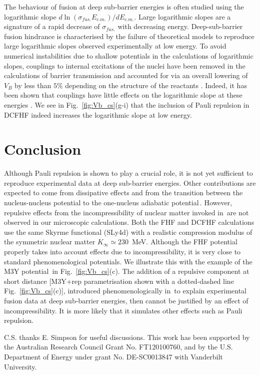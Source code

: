 The behaviour of fusion at deep sub-barrier energies is often studied using the  logarithmic slope 
$d\ln(\sigma_{fus.}E_{c.m.})/dE_{c.m.}$. 
Large logarithmic slopes are a signature of a rapid decrease of $\sigma_{fus.}$ with decreasing energy. 
Deep-sub-barrier fusion hindrance is characterised by the failure of theoretical models 
to reproduce  large logarithmic slopes observed experimentally at low energy. 
To avoid numerical instabilities due to shallow potentials in the calculations 
of logarithmic slopes, couplings to internal excitations of the nuclei have been removed 
in the calculations of barrier transmission and accounted for via an overall lowering of $V_B$ 
by less than $5\%$ depending on the structure of the reactants \citep{dasgupta2007}. 
Indeed, it has been shown that couplings have little effects on the logarithmic slope 
at these energies \citep{dasgupta2007}. 
We see in Fig.~\ref{fig:Vb_cs}(g-i) that the inclusion of Pauli repulsion in DCFHF 
indeed increases the logarithmic slope at low energy. 

\section{Conclusion}

Although Pauli repulsion is shown to play a crucial role, it is not yet sufficient to reproduce  
experimental data at deep sub-barrier energies. 
Other contributions are expected to come from dissipative effects \citep{dasgupta2007} 
and from the transition between the nucleus-nucleus potential 
to the one-nucleus adiabatic potential\,\citep{ichikawa2009b}.
However, repulsive effects  from the incompressibility of nuclear matter 
invoked in\,\citep{misicu2006} are not observed in our microscopic calculations. 
Both the FHF and DCFHF calculations use the same Skyrme functional 
(SLy4d) with a realistic compression modulus of the symmetric nuclear 
matter $K_\infty\simeq230$~MeV. 
Although the FHF potential properly takes into account  effects due to 
incompressibility, it is very close to standard phenomenological potentials. 
We illustrate this with the example of the M3Y potential\,\citep{misicu2006} in Fig.~\ref{fig:Vb_cs}(c). 
The addition of a repulsive component at short distance [M3Y+rep parametrisation 
shown with a dotted-dashed line Fig.~\ref{fig:Vb_cs}(c)],   introduced 
phenomenologically in\,\citep{misicu2006}  to explain experimental fusion data at deep 
sub-barrier energies,  then cannot be justified by an effect of incompressibility. 
It is more likely that it simulates other effects such as  Pauli repulsion. 

C.S. thanks E. Simpson for useful discussions.
This work has been supported by the
Australian Research Council Grant No. FT120100760,
and by the U.S. Department of Energy under grant No.
DE-SC0013847 with Vanderbilt University.


\clearpage

